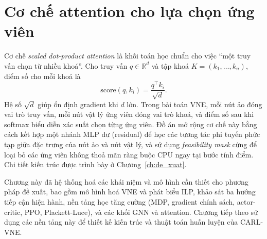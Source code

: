 \documentclass[../DoAn.tex]{subfiles}
\begin{document}
\section{Cơ chế attention cho lựa chọn ứng viên}
\label{sec:attention}

Cơ chế \textit{scaled dot-product attention}\cite{vaswani2017attention} là khối toán học chuẩn cho việc ``một truy vấn chọn từ nhiều khoá''. Cho truy vấn $q \in \mathbb{R}^d$ và tập khoá $K = (k_1, \ldots, k_n)$, điểm số cho mỗi khoá là
\begin{equation}
    \text{score}(q, k_i) = \frac{q^\top k_i}{\sqrt{d}}.
\end{equation}
Hệ số $\sqrt{d}$ giúp ổn định gradient khi $d$ lớn. Trong bài toán VNE, mỗi nút ảo đóng vai trò truy vấn, mỗi nút vật lý ứng viên đóng vai trò khoá, và điểm số sau khi softmax biểu diễn xác suất chọn từng ứng viên. Đồ án mở rộng cơ chế này bằng cách kết hợp một nhánh MLP dư (residual) để học các tương tác phi tuyến phức tạp giữa đặc trưng của nút ảo và nút vật lý, và sử dụng \textit{feasibility mask} cứng để loại bỏ các ứng viên không thoả mãn ràng buộc CPU ngay tại bước tính điểm. Chi tiết kiến trúc được trình bày ở Chương~\ref{ch:de_xuat}.

Chương này đã hệ thống hoá các khái niệm và mô hình cần thiết cho phương pháp đề xuất, bao gồm mô hình hoá VNE và phát biểu ILP, khảo sát ba hướng tiếp cận hiện hành, nền tảng học tăng cường (MDP, gradient chính sách, actor-critic, PPO, Plackett-Luce), và các khối GNN và attention. Chương tiếp theo sử dụng các nền tảng này để thiết kế kiến trúc và thuật toán huấn luyện của CARL-VNE.
\end{document}
